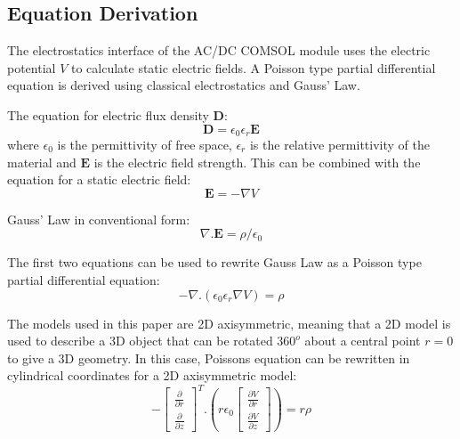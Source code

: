 \subsection{Equation Derivation}
The electrostatics interface of the AC/DC COMSOL module uses the electric potential $V$ to calculate static electric fields.
A Poisson type partial differential equation is derived using classical electrostatics and Gauss' Law.

The equation for electric flux density $\mathbf{D}$:
\begin{equation}
\mathbf{D} = \epsilon_0\epsilon_r\mathbf{E}
\end{equation}
where $\epsilon_0$ is the permittivity of free space, $\epsilon_r$ is the relative permittivity of the material and $\mathbf{E}$ is the electric field strength.
This can be combined with the equation for a static electric field:
\begin{equation}
\mathbf{E} = -\nabla V
\end{equation}

Gauss' Law in conventional form:
\begin{equation}
\nabla.\mathbf{E} = \rho/\epsilon_0
\end{equation}

The first two equations can be used to rewrite Gauss Law as a Poisson type partial differential equation:
\begin{equation}
-\nabla.(\epsilon_0\epsilon_r \nabla V) = \rho
\end{equation}

The models used in this paper are 2D axisymmetric, meaning that a 2D model is used to describe a 3D object that can be rotated $360^o$ about a central point $r=0$ to give a 3D geometry.
In this case, Poissons equation can be rewritten in cylindrical coordinates for a 2D axisymmetric model:
\begin{equation}
-\begin{bmatrix} 
\frac{\partial}{\partial r} \\
\frac{\partial}{\partial z}
\end{bmatrix}^T
.(r\epsilon_0 \begin{bmatrix}
\frac{\partial V}{\partial r} \\
\frac{\partial V}{\partial z}
\end{bmatrix})
= r\rho
\end{equation}

